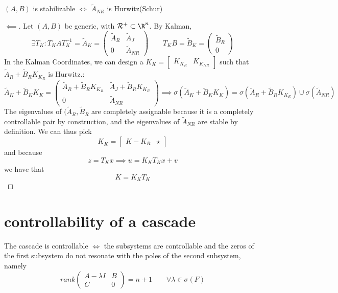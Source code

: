 \documentclass[english]{lectures}
\begin{document}
\begin{theorem}
    $(A,B)$ is stabilizable $\iff$ $\tilde{A}_{NR}$ is Hurwitz(Schur)
\end{theorem}
\begin{proof}[$\impliedby$]
    Let $(A,B)$ be generic, with $\mathcal{R}^+\subset \R^n$. By Kalman,
    \[
    \exists T_K:T_KAT_K^{-1}=\tilde{A}_K=\begin{pmatrix}
        \tilde{A}_R & \tilde{A}_J\\
        0 & \tilde{A}_{NR}
    \end{pmatrix} \qquad T_KB=\tilde{B}_K= \begin{pmatrix}
        \tilde{B}_R \\ 0
    \end{pmatrix}
    \]
    In the Kalman Coordinates, we can design a $K_K=\begin{bmatrix}
        K_{K_R} & K_{K_{NR}}
    \end{bmatrix}$ such that $\tilde{A}_R+\tilde{B}_RK_{K_R}$ is Hurwitz.:
    \[
        \tilde{A}_K+\tilde{B}_KK_{K}=\begin{pmatrix}
            \tilde{A}_R+\tilde{B}_RK_{K_R} & \tilde{A}_J+\tilde{B}_RK_{K_R}\\
            0 & \tilde{A}_{NR}
        \end{pmatrix} \implies \sigma(\tilde{A}_K+\tilde{B}_KK_{K})=\sigma(\tilde{A}_R+\tilde{B}_RK_{K_R})\cup \sigma(\tilde{A}_{NR})
    \]
    The eigenvalues of $(\tilde{A}_R,\tilde{B}_R$ are completely assignable because it is a completely controllable pair by construction, and the eigenvalues of $\tilde{A}_{NR}$ are stable by definition. We can thus pick
    \[
    K_K=\begin{bmatrix}
        K-{K_R} & \star
    \end{bmatrix}
    \]
    and because
    \[
    z=T_Kx \implies u=K_KT_Kx+v
    \]
    we have that
    \[
    K=K_KT_K
    \]
\end{proof}



\section{controllability of a cascade}

\begin{result}
    The cascade is controllable $\iff$ the subsystems are controllable and the zeros of the first subsystem do not resonate with the poles of the second subsystem, namely
    \[
    rank\begin{pmatrix}
        A-\lambda I & B\\
        C & 0
    \end{pmatrix}=n+1 \qquad \forall \lambda \in \sigma(F)
    \]
\end{result}
\end{document}

